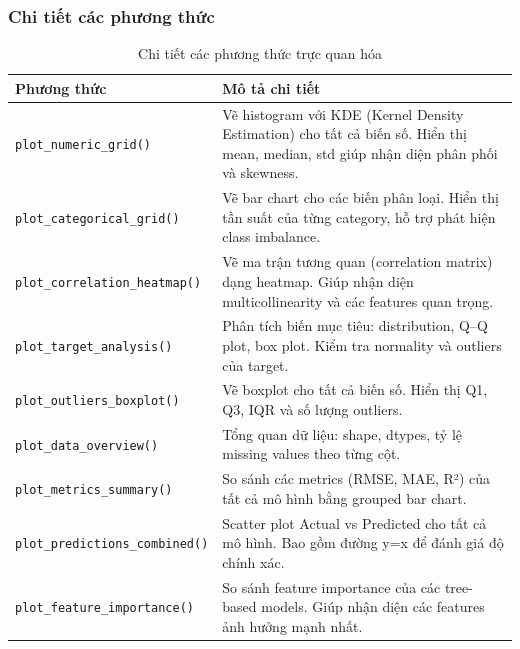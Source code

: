 \documentclass[12pt,a4paper]{article}
\begin{document}
\subsubsection{Chi tiết các phương thức}

\begin{table}[H]
\centering
\caption{Chi tiết các phương thức trực quan hóa}
\label{tab:visualizer_methods}

\renewcommand{\arraystretch}{1.35} %
\setlength{\tabcolsep}{10pt}       %

\begin{tabular}{|p{5cm}|p{8.5cm}|}
\hline
\textbf{Phương thức} & \textbf{Mô tả chi tiết} \\
\hline

\texttt{plot\_numeric\_grid()} &
Vẽ histogram với KDE (Kernel Density Estimation) cho tất cả biến số.
Hiển thị mean, median, std giúp nhận diện phân phối và skewness. \\
\hline

\texttt{plot\_categorical\_grid()} &
Vẽ bar chart cho các biến phân loại. Hiển thị tần suất của từng category,
hỗ trợ phát hiện class imbalance. \\
\hline

\texttt{plot\_correlation\_heatmap()} &
Vẽ ma trận tương quan (correlation matrix) dạng heatmap.
Giúp nhận diện multicollinearity và các features quan trọng. \\
\hline

\texttt{plot\_target\_analysis()} &
Phân tích biến mục tiêu: distribution, Q–Q plot, box plot.
Kiểm tra normality và outliers của target. \\
\hline

\texttt{plot\_outliers\_boxplot()} &
Vẽ boxplot cho tất cả biến số. Hiển thị Q1, Q3, IQR và số lượng outliers. \\
\hline

\texttt{plot\_data\_overview()} &
Tổng quan dữ liệu: shape, dtypes, tỷ lệ missing values theo từng cột. \\
\hline

\texttt{plot\_metrics\_summary()} &
So sánh các metrics (RMSE, MAE, R²) của tất cả mô hình bằng grouped bar chart. \\
\hline

\texttt{plot\_predictions\_combined()} &
Scatter plot Actual vs Predicted cho tất cả mô hình. Bao gồm đường y=x
để đánh giá độ chính xác. \\
\hline

\texttt{plot\_feature\_importance()} &
So sánh feature importance của các tree-based models.
Giúp nhận diện các features ảnh hưởng mạnh nhất. \\
\hline

\end{tabular}
\end{table}
\end{document}
